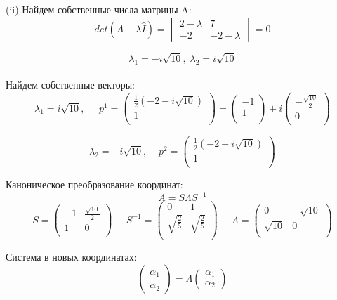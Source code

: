 \documentclass[a4paper, 12pt]{article}
\begin{document}
(ii) Найдем собственные числа матрицы A:
\[det(A-\lambda \hat{I})=
\begin{vmatrix}
2-\lambda & 7 \\
-2 & -2-\lambda
\end{vmatrix}
=0\]

\[\lambda_1=-i\sqrt{10}, \; \lambda_2=i\sqrt{10}\]
\\Найдем собственные векторы:
\[\lambda_1=i\sqrt{10},\;\;\;\;\; p^1=
\left(
\begin{array}{cc}
\frac 1 2 (-2-i\sqrt{10})\\
1\\
\end{array}
\right)=\left(
\begin{array}{cc}
-1\\
1\\
\end{array}
\right) +i
\left(
\begin{array}{cc}
-\frac{\sqrt{10}}{2}\\
0\\
\end{array}
\right)
\]



\[\lambda_2=-i\sqrt{10},\;\;\;\; p^2=
\left(
\begin{array}{cc}
\frac 1 2 (-2+i\sqrt{10})\\
1\\
\end{array}
\right) 
\]

Каноническое преобразование координат:
\[A = S\Lambda S^{-1}\]
\[
S = \left(
\begin{array}{cc}
-1& \frac{\sqrt{10}}{2}\\
1 & 0\\
\end{array}
\right)\;\;\;\;\;
S^{-1} = \left(
\begin{array}{cc}
0 & 1\\
\sqrt{\frac {2}{5}} & \sqrt{\frac {2}{5}}\\
\end{array}\right)\;\;\;\;\;
\Lambda = \left(
\begin{array}{cc}
0 & -\sqrt{10}\\
\sqrt{10} & 0\\
\end{array}\right)
\]

Система в новых координатах:
\[\left(
\begin{array}{c}
\dot{\alpha}_1\\
\dot{\alpha}_2
\end{array}
\right)=\Lambda\left(
\begin{array}{c}
{\alpha}_1 \\
{\alpha}_2
\end{array}
\right)\]
\end{document}
